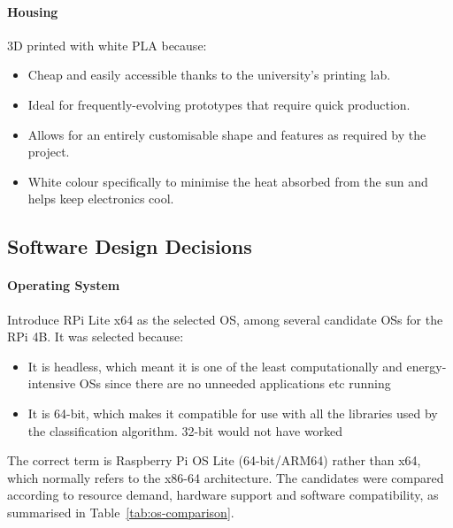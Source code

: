 \paragraph{Housing}
\par\vspace{6pt}
3D printed with white PLA because:
\begin{itemize}
    \item Cheap and easily accessible thanks to the university's printing lab.
    \item Ideal for frequently-evolving prototypes that require quick production.
    \item Allows for an entirely customisable shape and features as required by the project.
    \item White colour specifically to minimise the heat absorbed from the sun and helps keep electronics cool.
\end{itemize}

\subsection{Software Design Decisions}
\label{subsec:SoftwareDesignDecisions}

\paragraph{Operating System}
\par\vspace{6pt}
Introduce RPi Lite x64 as the selected OS, among several candidate OSs for the RPi 4B. It was selected because:
\begin{itemize}
    \item It is headless, which meant it is one of the least computationally and energy-intensive OSs since there are no unneeded applications etc running
    \item It is 64-bit, which makes it compatible for use with all the libraries used by the classification algorithm. 32-bit would not have worked
\end{itemize}

The correct term is Raspberry Pi OS Lite (64-bit/ARM64) rather than x64, which normally refers to the x86-64 architecture. The candidates were compared according to resource demand, hardware support and software compatibility, as summarised in Table~\ref{tab:os-comparison}.

